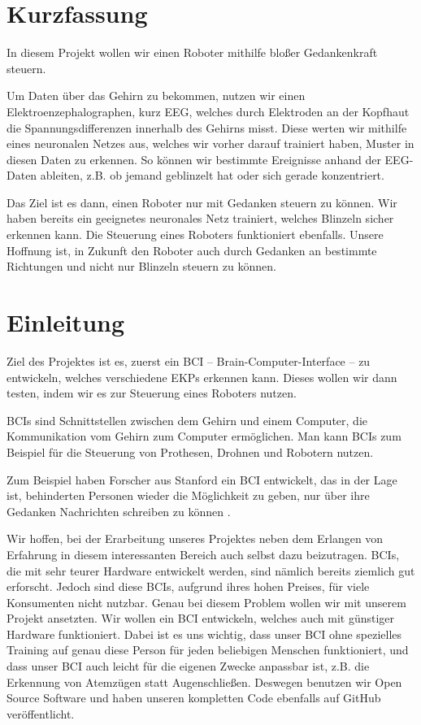 \documentclass[10pt]{scrartcl}
\begin{document}
	\newpage

	
	\tableofcontents
	
	\newpage

	\section{Kurzfassung}


	In diesem Projekt wollen wir einen Roboter mithilfe bloßer Gedankenkraft steuern.

	Um Daten über das Gehirn zu bekommen, nutzen wir einen Elektroenzephalographen, kurz EEG, welches durch Elektroden an der Kopfhaut die Spannungsdifferenzen innerhalb des Gehirns misst. Diese werten wir mithilfe eines neuronalen Netzes aus, welches wir vorher darauf trainiert haben, Muster in diesen Daten zu erkennen. So können wir bestimmte Ereignisse anhand der EEG-Daten ableiten, z.B. ob jemand geblinzelt hat oder sich gerade konzentriert.
	
	Das Ziel ist es dann, einen Roboter nur mit Gedanken steuern zu können.
	Wir haben bereits ein geeignetes neuronales Netz trainiert, welches Blinzeln sicher erkennen kann. Die Steuerung eines Roboters funktioniert ebenfalls.
	Unsere Hoffnung ist, in Zukunft den Roboter auch durch Gedanken an bestimmte Richtungen und nicht nur Blinzeln steuern zu können.

	\section{Einleitung}

	Ziel des Projektes ist es, zuerst ein BCI -- Brain-Computer-Interface -- zu entwickeln, welches verschiedene EKPs erkennen kann. Dieses wollen wir dann testen, indem wir es zur Steuerung eines Roboters nutzen.

	BCIs sind Schnittstellen zwischen dem Gehirn und einem Computer, die Kommunikation vom Gehirn zum Computer ermöglichen. Man kann BCIs zum Beispiel für die Steuerung von Prothesen, Drohnen und Robotern nutzen.

	Zum Beispiel haben Forscher aus Stanford ein BCI entwickelt, das in der Lage ist, behinderten Personen wieder die Möglichkeit zu geben, nur über ihre Gedanken Nachrichten schreiben zu können \cite{brain2text}.
	
	Wir hoffen, bei der Erarbeitung unseres Projektes neben dem Erlangen von Erfahrung in diesem interessanten Bereich auch selbst dazu beizutragen. BCIs, die mit sehr teurer Hardware entwickelt werden, sind nämlich bereits ziemlich gut erforscht. Jedoch sind diese BCIs, aufgrund ihres hohen Preises, für viele Konsumenten nicht nutzbar. Genau bei diesem Problem wollen wir mit unserem Projekt ansetzten. Wir wollen ein BCI entwickeln, welches auch mit günstiger Hardware funktioniert. Dabei ist es uns wichtig, dass unser BCI ohne spezielles Training auf genau diese Person für jeden beliebigen Menschen funktioniert, und dass unser BCI auch leicht für die eigenen Zwecke anpassbar ist, z.B. die Erkennung von Atemzügen statt Augenschließen. Deswegen benutzen wir Open Source Software und haben unseren kompletten Code ebenfalls auf GitHub veröffentlicht.
\end{document}
